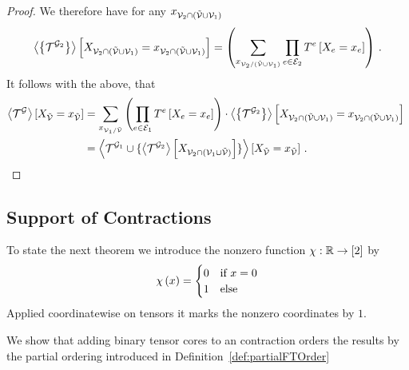 \begin{proof}
	We therefore have for any $x_{\mathcal{V}_2\cap(\tilde{\mathcal{V}}\cup\mathcal{V}_1)}$ 
	\begin{align*}
		\left\langle \left\{\mathcal{T}^{\mathcal{G}_2}\right\}\right\rangle \left[ X_{\mathcal{V}_2\cap(\tilde{\mathcal{V}}\cup\mathcal{V}_1)}=x_{\mathcal{V}_2\cap(\tilde{\mathcal{V}}\cup\mathcal{V}_1)} \right] =
		 \left( \sum_{x_{\mathcal{V}_2/(\tilde{\mathcal{V}}\cup\mathcal{V}_1)}}  \prod_{e\in\mathcal{E}_2} T^{e}\left[X_{e}=x_{e}\right]  \right) \, . 
	\end{align*}
	It follows with the above, that 
	\begin{align*}
		\contractionof{\tnetof{\graph}}{\indexedcatvariableof{\secnodes}} 
		& =  \sum_{\catindexof{\nodes_1/\secnodes}}  \left( \prod_{\edge\in\edges_1} \hypercoreofat{\edge}{\indexedcatvariableof{\edge}} \right) \cdot \sbcontractionof{\tnetof{\graph_2}}{\indexedcatvariableof{\nodes_2\cap(\secnodes\cup\nodes_1)}} \\
		& = \contractionof{\tnetof{\graph_1} \cup \{
			\contractionof{\tnetof{\graph_2}}{\catvariableof{\nodes_2\cap(\nodes_1\cup\secnodes)}}
		\}}{\indexedcatvariableof{\secnodes}}   \, . 
	\end{align*}
\end{proof}







\subsection{Support of Contractions}\label{sec:supportContractionEquations}



To state the next theorem we introduce the nonzero function $\chi: \mathbb{R} \rightarrow [2]$ by
\begin{align}
	\chi\left(x\right) = \begin{cases}
	0 & \text{if }x=0 \\
	1 & \text{else}
	\end{cases}
\end{align}
Applied coordinatewise on tensors it marks the nonzero coordinates by $1$.

We show that adding binary tensor cores to an contraction orders the results by the partial ordering introduced in Definition~\ref{def:partialFTOrder}


